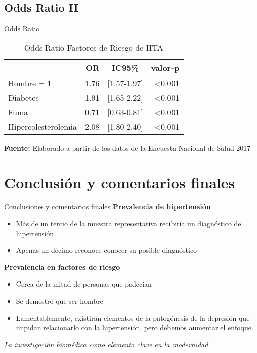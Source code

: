 \documentclass[aspectratio=169]{beamer}
\newcommand{\pro}{\item [$\blacktriangleright$]}
\begin{document}
\subsection*{Odds Ratio II}
\begin{frame}{Odds Ratio}
    \begin{table}[b]
\caption{\small Odds Ratio Factores de Riesgo de HTA}
    \centering
    \small
\begin{tabular}{lrcr}
\toprule
  & OR & IC95\% & valor-p\\
\midrule
Hombre = 1 & 1.76 & [1.57-1.97] & <0.001\\
Diabetes & 1.91 & [1.65-2.22] & <0.001\\
\addlinespace
Fuma & 0.71 & [0.63-0.81] & <0.001\\
\addlinespace
Hipercolesterolemia & 2.08 & [1.80-2.40] & <0.001\\
\bottomrule
\end{tabular}
    \vspace{1ex}
    
    {\raggedright \small \textbf{Fuente:} Elaborado a partir de los datos de la Encuesta Nacional de Salud 2017 \par}
\end{table}
\end{frame}

\section{Conclusión y comentarios finales}

\begin{frame}{Conclusiones y comentarios finales}
    \textcolor{preambulo}{\textbf{Prevalencia de hipertensión}}
    \begin{itemize}
    \pro Más de un tercio de la muestra representativa recibiría un diagnóstico de hipertensión
    \pro Apenas un décimo reconoce conocer su posible diagnóstico
    \end{itemize}

\textcolor{preambulo}{\textbf{Prevalencia en factores de riesgo}}
\begin{itemize}
    \pro Cerca de la mitad de personas que padecían 
    \pro Se demostró que ser hombre
    \pro Lamentablemente, existirán elementos de la patogénesis de la depresión que impidan relacionarlo con la hipertensión, pero debemos aumentar el enfoque.
\end{itemize}

\textit{La investigación biomédica como elemento clave en la modernidad}
\end{frame}
\end{document}
